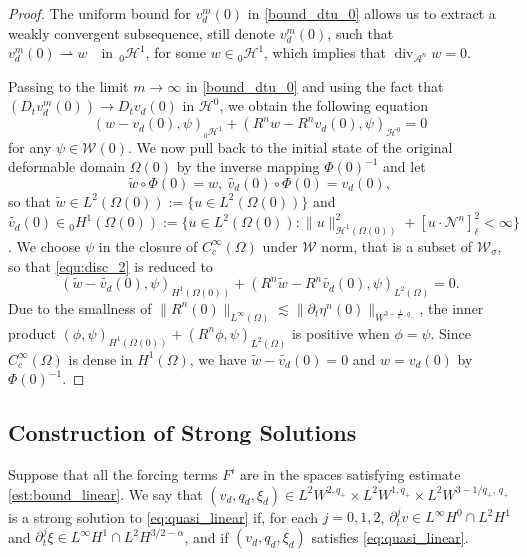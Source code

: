 \documentclass[letterpaper,reqno,10pt,twoside]{amsart}
\theoremstyle{definition}
\theoremstyle{remark}
\def\p{\partial}
\def\Om{\Omega}
\begin{document}
	\begin{proof}
		The uniform bound for $v_{d}^m(0)$ in \eqref{bound_dtu_0} allows us to extract a weakly convergent subsequence, still denote $v_d^m(0)$, such that
		$v_{d}^m(0)\rightharpoonup w\quad\text{in}~~{}_0\mathcal{H}^1$,
		for some $w\in {}_0\mathcal{H}^1$, which implies that $\operatorname{div}_{\mathcal{A}^{n}}w=0$.
		
		Passing to the limit $m\to \infty$ in \eqref{bound_dtu_0} and
		using the fact that $(D_{t}v_{d}^{m}(0))\to D_{t}v_{d}(0)$ in $\mathcal{H}^0$,
		we obtain the following equation
		\begin{equation}\label{eq:in_dtu_1}
			(w-v_{d}(0), \psi)_{{}_0\mathcal{H}^1}+(R^{n}w-R^{n}v_{d}(0),\psi)_{\mathcal{H}^{0}}=0
		\end{equation}
		for any $\psi\in\mathcal{W}(0)$.  We now pull back to the initial state of the original deformable domain $\Om(0)$ by the inverse mapping $\Phi(0)^{-1}$ and let 
		\[
		\tilde{w}\circ \Phi(0)=w,\  \widetilde{v_{d}}(0)\circ\Phi(0)=v_{d}(0),
		\]
		so that $\tilde{w}\in L^2(\Om(0)):=\{u\in L^2(\Om(0)) \}$ and
		$
		\widetilde{v_{d}}(0)\in {}_{0}{H}^{1}(\Om(0)):=\{u\in L^2(\Om(0)): \|u\|_{\mathcal{H}^{1}(\Om(0))}^2+[u\cdot\mathcal{N}^{n}]_\ell^2<\infty\}$.
		We choose $\psi$ in the closure of $C_{c}^\infty(\Om)$ under $\mathcal{W}$ norm, that is a subset of $\mathcal{W}_{\sigma}$, so that \eqref{equ:disc_2} is reduced to
		\[
		(\tilde{w}-\widetilde{v_{d}}(0), \psi)_{H^{1}(\Om(0))}+(R^{n}\tilde{w}-R^{n}\tilde{v_{d}}(0),\psi)_{L^{2}(\Omega)}=0.
		\]
		Due to the smallness of $\|R^{n}(0)\|_{L^{\infty}(\Omega)}\lesssim\|\p_{t}\eta^{n}(0)\|_{W^{3-\frac{1}{q_{-}},q_{-}}}$, the inner product 
		$(\phi, \psi)_{H^{1}(\Om(0))}+(R^{n}\phi,\psi)_{L^{2}(\Omega)}$ is positive when $\phi=\psi$. Since $C_{c}^\infty(\Om)$ is dense in $H^1(\Om)$, we have
		$\tilde{w}-\widetilde{v_{d}}(0)=0$ and $w=v_{d}(0)$ by $\Phi(0)^{-1}$.
	\end{proof}
	
	
	\subsection{Construction of Strong Solutions}
	
	
	Suppose that all the forcing terms $F^{i}$ are in the spaces satisfying estimate \eqref{est:bound_linear}. We say that
	$(v_{d},q_{d},\xi_{d})\in L^{2}W^{2,q_{+}}\times L^{2}W^{1,q_{+}}\times L^{2}W^{3-1/q_{+},\,q_{+}}$
	is a strong solution to \eqref{eq:quasi_linear} if, for each \(j=0,1,2\), $
	\partial_t^j v \in L^\infty H^0 \cap L^2 H^1$ and $
	\partial_t^j \xi \in L^\infty H^1 \cap L^2 H^{3/2-\alpha}$,
	and if \((v_{d},q_{d},\xi_{d})\) satisfies \eqref{eq:quasi_linear}.
	
\end{document}

